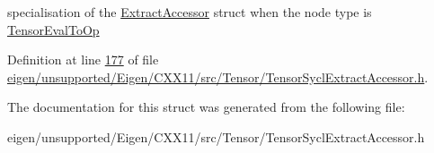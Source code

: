 specialisation of the \hyperlink{struct_eigen_1_1_tensor_sycl_1_1internal_1_1_extract_accessor}{Extract\+Accessor} struct when the node type is \hyperlink{class_eigen_1_1_tensor_eval_to_op}{Tensor\+Eval\+To\+Op} 

Definition at line \hyperlink{eigen_2unsupported_2_eigen_2_c_x_x11_2src_2_tensor_2_tensor_sycl_extract_accessor_8h_source_l00177}{177} of file \hyperlink{eigen_2unsupported_2_eigen_2_c_x_x11_2src_2_tensor_2_tensor_sycl_extract_accessor_8h_source}{eigen/unsupported/\+Eigen/\+C\+X\+X11/src/\+Tensor/\+Tensor\+Sycl\+Extract\+Accessor.\+h}.



The documentation for this struct was generated from the following file\+:\begin{DoxyCompactItemize}
\item 
eigen/unsupported/\+Eigen/\+C\+X\+X11/src/\+Tensor/\+Tensor\+Sycl\+Extract\+Accessor.\+h\end{DoxyCompactItemize}
